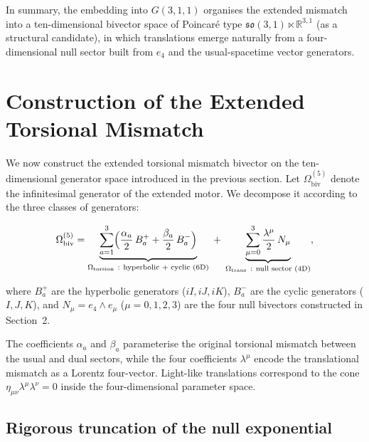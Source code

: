 \documentclass[dvipdfmx,a4paper]{article}
\theoremstyle{definition}
\theoremstyle{plain}
\theoremstyle{remark}
\begin{document}
In summary, the embedding into \(G(3,1,1)\) organises the extended mismatch into a ten-dimensional bivector space of Poincar\'{e} type \(\mathfrak{so}(3,1)\ltimes\mathbb{R}^{3,1}\) (as a structural candidate), in which translations emerge naturally from a four-dimensional null sector built from \(e_{4}\) and the usual-spacetime vector generators.

\section{Construction of the Extended Torsional Mismatch}

We now construct the extended torsional mismatch bivector on the ten-dimensional generator space introduced in the previous section. Let \(\Omega_{\text{biv}}^{(5)}\) denote the infinitesimal generator of the extended motor. We decompose it according to the three classes of generators:

\begin{equation}
\Omega_{\text{biv}}^{(5)}
= \underbrace{\sum_{a=1}^{3} \Bigl( \frac{\alpha_{a}}{2}\, B_{a}^{+} + \frac{\beta_{a}}{2}\, B_{a}^{-} \Bigr)}_{\Omega_{\text{torsion}}\ :\ \text{hyperbolic + cyclic (6D)}}
\;+\;
\underbrace{\sum_{\mu=0}^{3} \frac{\lambda^{\mu}}{2}\, N_{\mu}}_{\Omega_{\text{trans}}\ :\ \text{null sector (4D)}},
\label{eq:Omega-decomp}
\end{equation}

where \(B_{a}^{+}\) are the hyperbolic generators (\(iI, iJ, iK\)), \(B_{a}^{-}\) are the cyclic generators (\(I, J, K\)), and \(N_{\mu}=e_{4}\wedge e_{\mu}\) (\(\mu=0,1,2,3\)) are the four null bivectors constructed in Section~2.

The coefficients \(\alpha_{a}\) and \(\beta_{a}\) parameterise the original torsional mismatch between the usual and dual sectors, while the four coefficients \(\lambda^{\mu}\) encode the translational mismatch as a Lorentz four-vector. Light-like translations correspond to the cone \(\eta_{\mu\nu}\lambda^{\mu}\lambda^{\nu}=0\) inside the four-dimensional parameter space.

\subsection{Rigorous truncation of the null exponential}
\end{document}
